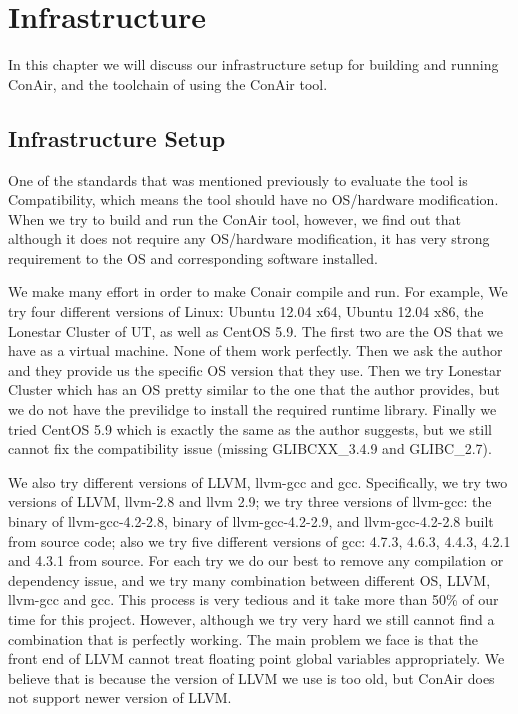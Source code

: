 \chapter{Infrastructure}
In this chapter we will discuss our infrastructure setup for building and
running ConAir, and the toolchain of using the ConAir tool.

\section{Infrastructure Setup}
One of the standards that was mentioned previously to evaluate the tool is
Compatibility, which means the tool should have no OS/hardware modification.
When we try to build and run the ConAir tool, however, we find out that although
it does not require any OS/hardware modification, it has very strong requirement
to the OS and corresponding software installed.

We make many effort in order to make Conair compile and run. For example, We try
four different versions of Linux: Ubuntu 12.04 x64, Ubuntu 12.04 x86, the
Lonestar Cluster of UT, as well as CentOS 5.9. The first two are the OS that we
have as a virtual machine. None of them work perfectly. Then we ask the
author and they provide us the specific OS version that they use. Then we try
Lonestar Cluster which has an OS pretty similar to the one that the author
provides, but we do not have the previlidge to install the required runtime
library. Finally we tried CentOS 5.9 which is exactly the same as the author
suggests, but we still cannot fix the compatibility issue (missing GLIBCXX\_3.4.9
and GLIBC\_2.7).

We also try different versions of LLVM, llvm-gcc and gcc. Specifically, we try
two versions of LLVM, llvm-2.8 and llvm 2.9; we try three versions of llvm-gcc:
the binary of llvm-gcc-4.2-2.8, binary of llvm-gcc-4.2-2.9, and llvm-gcc-4.2-2.8
built from source code; also we try five different versions of gcc: 4.7.3,
4.6.3, 4.4.3, 4.2.1 and 4.3.1 from source. For each try we do our best to remove
any compilation or dependency issue, and we try many combination between
different OS, LLVM, llvm-gcc and gcc. This process is very tedious and it take
more than 50\% of our time for this project. However, although we try very hard
we still cannot find a combination that is perfectly working. The main problem
we face is that the front end of LLVM cannot treat floating point global
variables appropriately. We believe that is because the version of LLVM we use
is too old, but ConAir does not support newer version of LLVM.

